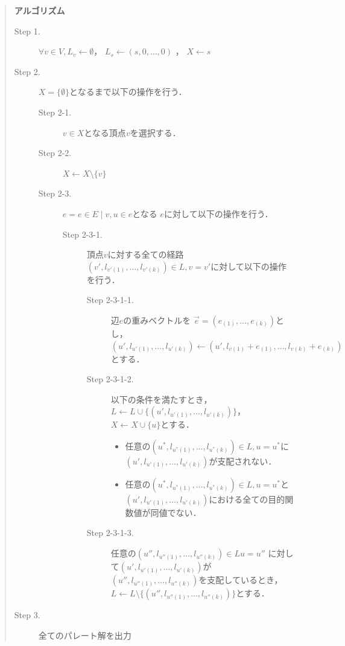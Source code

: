 \documentclass[12pt]{optlab-bachelor}
\begin{document}
\begin{quote}
  \textbf{アルゴリズム}
  \begin{description}
    \item[Step 1.] $\forall v \in V , L_v \leftarrow \emptyset$，
    $L_s \leftarrow (s,0,\ldots,0)$ ， $X \leftarrow s$
    \item[Step 2.] $X = \{\emptyset\}$となるまで以下の操作を行う．
    \begin{description}
      \item[Step 2-1.] $v \in X$となる頂点$v$を選択する．
      \item[Step 2-2.] $X \leftarrow X \setminus \{ v \}$
      \item[Step 2-3.] $e = {e \in E \mid v,u \in e}$となる
      $e$に対して以下の操作を行う．
      \begin{description}
        \item[Step 2-3-1.] 頂点$v$に対する全ての経路
        $(v',l_{v'(1)},\ldots,l_{v'(k)}) \in L,v=v'$に対して以下の操作を行う．
        \begin{description}
          \item[Step 2-3-1-1.] 辺$e$の重みベクトルを
          $\vec{e} = (e_{(1)},\ldots,e_{(k)})$とし，
          $(u',l_{u'(1)},\ldots,l_{u'(k)}) \leftarrow
          (u',l_{v(1)}+e_{(1)},\ldots,l_{v(k)}+e_{(k)})$とする．
          \item[Step 2-3-1-2.] 以下の条件を満たすとき，
          $L \leftarrow L \cup \{(u',l_{u'(1)},\ldots,l_{u'(k)})\}$，
          $X \leftarrow X \cup \{ u\}$とする．
          \begin{itemize}
            \item 任意の$(u^*,l_{u^*(1)},\ldots,l_{u^*(k)})\in L,u=u^*$に
            $(u',l_{u'(1)},\ldots,l_{u'(k)})$が支配されない．
            \item 任意の$(u^*,l_{u^*(1)},\ldots,l_{u^*(k)}) \in L,u=u^*$と
            $(u',l_{u'(1)},\ldots,l_{u'(k)})$における全ての目的関数値が同値でない．
          \end{itemize}
          \item[Step 2-3-1-3.] 任意の$(u'',l_{u''(1)},\ldots,l_{u''(k)})\in Lu=u''$
          に対して$(u',l_{u'(1)},\ldots,l_{u'(k)})$が
          $(u'',l_{u''(1)},\ldots,l_{u''(k)})$を支配しているとき，
          $L \leftarrow L \setminus \{(u'',l_{u''(1)},\ldots,l_{u''(k)})\}$とする．
        \end{description}
      \end{description}
    \end{description}
    \item[Step 3.] 全てのパレート解を出力
  \end{description}
\end{quote}
\end{document}
